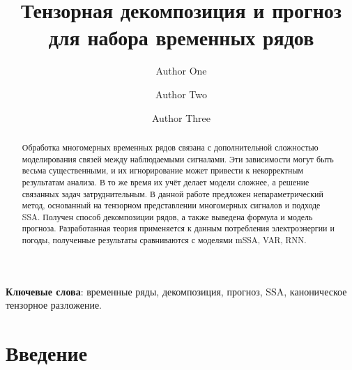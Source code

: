 
\usepackage[backend=biber, sorting=none]{biblatex}
\usepackage{subfigure}




\theoremstyle{definition}
\newtheorem*{Def}{Определение}
\theoremstyle{plain}
\newtheorem{Lem}{Лемма}
\newtheorem{Th}{Теорема}

\newcommand{\delayV}[1]{\overset{\leftarrow}{\mathbf{x}}_{#1}}
\newcommand{\delayM}[1]{\overset{\leftarrow}{\mathbf{X}}_{#1}}

\title{Тензорная декомпозиция и прогноз для набора временных рядов}

\author[1]{Author One}
\author[2]{Author Two}
\author[3]{Author Three}


\date{}


	
	\maketitle
	
	\begin{abstract}
		
		Обработка многомерных временных рядов связана с дополнительной сложностью моделирования связей между наблюдаемыми сигналами. Эти зависимости могут быть весьма существенными, и их игнорирование может привести к некорректным результатам анализа. В то же время их учёт делает модели сложнее, а решение связанных задач затруднительным. В данной работе предложен непараметрический метод, основанный на тензорном представлении многомерных сигналов и подходе SSA. Получен способ декомпозиции рядов, а также выведена формула и модель прогноза. Разработанная теория применяется к данным потребления электроэнергии и погоды, полученные результаты сравниваются с моделями mSSA, VAR, RNN.
		
	\end{abstract}
	
	\textbf{Ключевые слова}: {\small временные ряды, декомпозиция, прогноз, SSA, каноническое тензорное разложение}.
	
	
	\section{Введение}\label{Intro}
	
